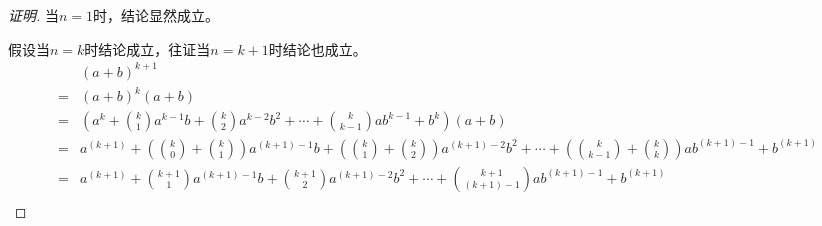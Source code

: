 \documentclass{article}
\begin{document}
\begin{CJK*}{UTF8}{gbsn}
\begin{proof}[证明]
当$n=1$时，结论显然成立。

假设当$n=k$时结论成立，往证当$n=k+1$时结论也成立。
\begin{align*}
  &(a+b)^{k+1}\\
  =&(a+b)^k(a+b)\\
  =&(a^k+\binom{k}{1}a^{k-1}b+\binom{k}{2}a^{k-2}b^2+\cdots+\binom{k}{k-1}ab^{k-1}+b^k)(a+b)\\
  =&a^{(k+1)}+(\binom{k}{0}+\binom{k}{1})a^{(k+1)-1}b+(\binom{k}{1}+\binom{k}{2})a^{(k+1)-2}b^2+\cdots+(\binom{k}{k-1}+\binom{k}{k})ab^{(k+1)-1}+b^{(k+1)}\\
  =&a^{(k+1)}+\binom{k+1}{1}a^{(k+1)-1}b+\binom{k+1}{2}a^{(k+1)-2}b^2+\cdots+\binom{k+1}{(k+1)-1}ab^{(k+1)-1}+b^{(k+1)}\\
\end{align*}
\end{proof}
\end{CJK*}
\end{document}
